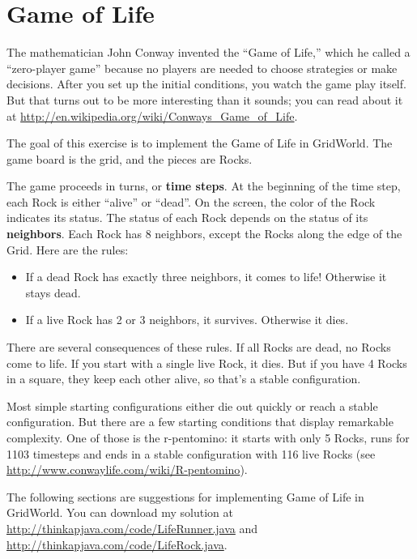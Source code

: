 \section{Game of Life}

The mathematician John Conway invented the ``Game of Life,'' which he called a ``zero-player game'' because no players are needed to choose strategies or make decisions.
After you set up the initial conditions, you watch the game play itself.
But that turns out to be more interesting than it sounds; you can read about it at \url{http://en.wikipedia.org/wiki/Conways_Game_of_Life}.

The goal of this exercise is to implement the Game of Life in GridWorld.
The game board is the grid, and the pieces are Rocks.

The game proceeds in turns, or {\bf time steps}.
At the beginning of the time step, each Rock is either ``alive'' or ``dead''.
On the screen, the color of the Rock indicates its status.
%
The status of each Rock depends on the status of its {\bf neighbors}.
Each Rock has 8 neighbors, except the Rocks along the edge of the Grid.
Here are the rules:

\begin{itemize}

\item If a dead Rock has exactly three neighbors, it comes to life!
Otherwise it stays dead.

\item If a live Rock has 2 or 3 neighbors, it survives.
Otherwise it dies.

\end{itemize}

There are several consequences of these rules.
If all Rocks are dead, no Rocks come to life.
If you start with a single live Rock, it dies.
But if you have 4 Rocks in a square, they keep each other alive, so that's a stable configuration.

Most simple starting configurations either die out quickly or reach a stable configuration.
But there are a few starting conditions that display remarkable complexity.
One of those is the r-pentomino: it starts with only 5 Rocks, runs for 1103 timesteps and ends in a stable configuration with 116 live Rocks (see \url{http://www.conwaylife.com/wiki/R-pentomino}).

The following sections are suggestions for implementing Game of Life in GridWorld.
You can download my solution at \url{http://thinkapjava.com/code/LifeRunner.java} and \url{http://thinkapjava.com/code/LifeRock.java}.


